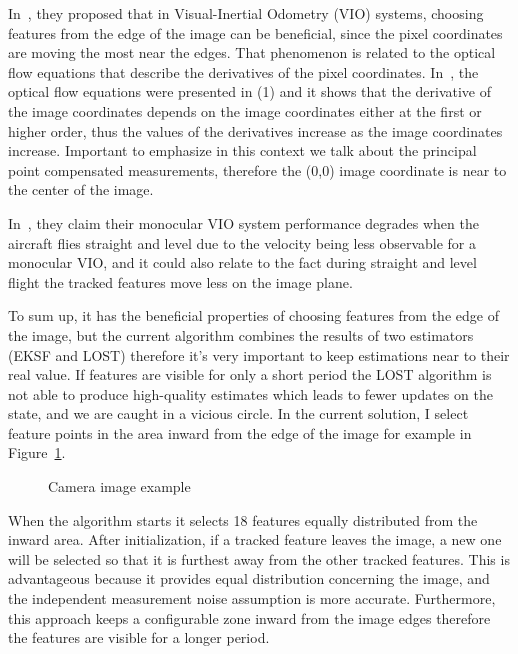 In~\cite{image-based-INS}, they proposed that in Visual-Inertial Odometry (VIO) systems, choosing features from the edge of the image can be beneficial, since the pixel coordinates are moving the most near the edges. That phenomenon is related to the optical flow equations that describe the derivatives of the pixel coordinates. In~\cite{optic-flow}, the optical flow equations were presented in (1) and it shows that the derivative of the image coordinates depends on the image coordinates either at the first or higher order, thus the values of the derivatives increase as the image coordinates increase. Important to emphasize in this context we talk about the principal point compensated measurements, therefore the (0,0) image coordinate is near to the center of the image.

In~\cite{rel-nav}, they claim their monocular VIO system performance degrades when the aircraft flies straight and level due to the velocity being less observable for a monocular VIO, and it could also relate to the fact during straight and level flight the tracked features move less on the image plane.

To sum up, it has the beneficial properties of choosing features from the edge of the image, but the current algorithm combines the results of two estimators (EKSF and LOST) therefore it's very important to keep estimations near to their real value. If features are visible for only a short period the LOST algorithm is not able to produce high-quality estimates which leads to fewer updates on the state, and we are caught in a vicious circle. In the current solution, I select feature points in the area inward from the edge of the image for example in Figure~\ref{fig:camera-image}.

\begin{figure}[!ht]
    \centering
    
    \caption{Camera image example}\label{fig:camera-image}
\end{figure}

When the algorithm starts it selects 18 features equally distributed from the inward area. After initialization, if a tracked feature leaves the image, a new one will be selected so that it is furthest away from the other tracked features. This is advantageous because it provides equal distribution concerning the image, and the independent measurement noise assumption is more accurate. Furthermore, this approach keeps a configurable zone inward from the image edges therefore the features are visible for a longer period.

